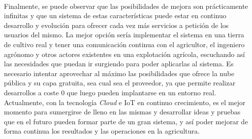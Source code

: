 \documentclass[../../memoria.tex]{subfiles}
\begin{document}
\paragraph{}
Finalmente, se puede observar que las posibilidades de mejora son prácticamente infinitas y que un sistema de estas características puede estar en continuo desarrollo y evolución para ofrecer cada vez más servicios a petición de los usuarios del mismo. La mejor opción sería implementar el sistema en una tierra de cultivo real y tener una comunicación continua con el agricultor, el ingeniero agrónomo y otros actores existentes en una explotación agrícola, escuchando así las necesidades que puedan ir surgiendo para poder aplicarlas al sistema. Es necesario intentar aprovechar al máximo las posibilidades que ofrece la nube pública y su capa gratuita, sea cual sea el proveedor, ya que permite realizar desarrollos a coste 0 que luego pueden implantarse en un entorno real. Actualmente, con la tecnología \textit{Cloud} e IoT en continuo crecimiento, es el mejor momento para sumergirse de lleno en las mismas y desarrollar ideas y pruebas que en el futuro pueden formar parte de un gran sistema, y así poder mejorar de forma continua los resultados y las operaciones en la agricultura.
\end{document}
